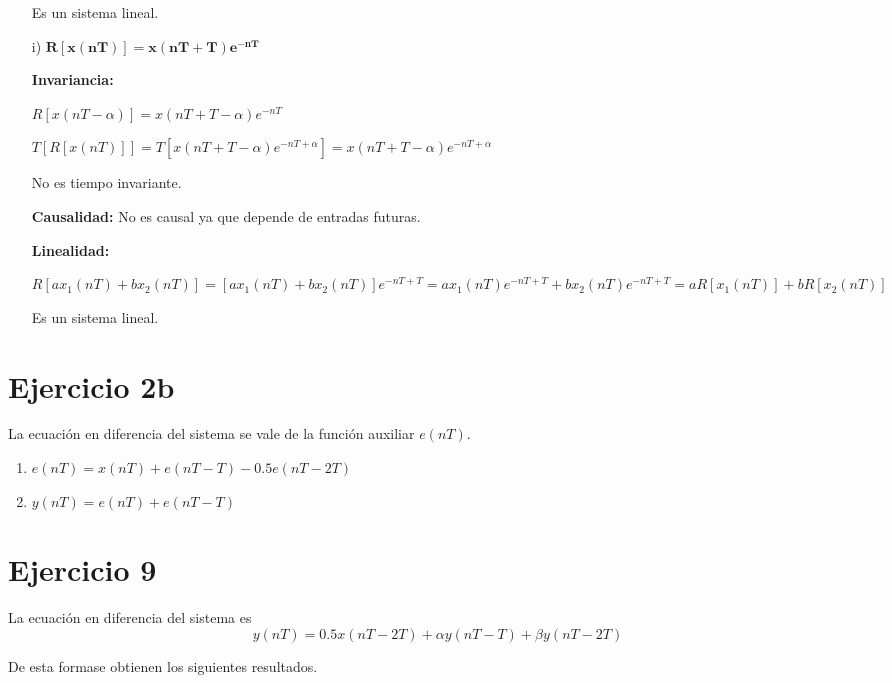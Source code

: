 \begin{itemize}
		Es un sistema lineal.
		
	\item[i)] $\mathbf{R \left[ x \left( nT \right) \right] = x \left( nT + T\right) e^{-nT}}$ 
	
		\textbf{Invariancia:}
		
		$R \left[ x \left( nT - \alpha \right) \right] =  x \left( nT + T - \alpha  \right) e^{-nT}$ 
		
		$T \left[ R \left[ x \left( nT \right) \right] \right] = T \left[  x \left( nT + T - \alpha \right) e^{-nT + \alpha} \right] = x \left( nT + T -\alpha \right) e^{-nT + \alpha}$ 
		
		No es tiempo invariante.
		
		\textbf{Causalidad:} No es causal ya que depende de entradas futuras.
		
		\textbf{Linealidad:}
		
		 $R \left[ ax_1 \left( nT \right) + bx_2 \left( nT \right) \right] = \left[ a x_{1} \left( nT \right) + b x_{2} \left( nT \right) \right] e^{-nT + T} = a x_{1} \left( nT \right) e^{-nT + T} + b x_{2} \left( nT \right) e^{-nT + T} = aR \left[ x_1 \left( nT \right) \right] + bR \left[ x_2 \left( nT \right) \right]$

		Es un sistema lineal.		

\end{itemize}

\section*{Ejercicio 2b}
La ecuación en diferencia del sistema se vale de la función auxiliar $e(nT)$.

\begin{enumerate}
	\item	$e(nT) = x(nT) + e(nT - T) - 0.5e(nT - 2T)$
	\item	$y(nT) = e(nT) + e(nT - T)$
\end{enumerate}

\section*{Ejercicio 9}
La ecuación en diferencia del sistema es
\begin{equation*}
	y(nT) = 0.5x(nT - 2T) + \alpha y(nT - T) + \beta y(nT - 2T)
\end{equation*}

De esta formase obtienen los siguientes resultados.

